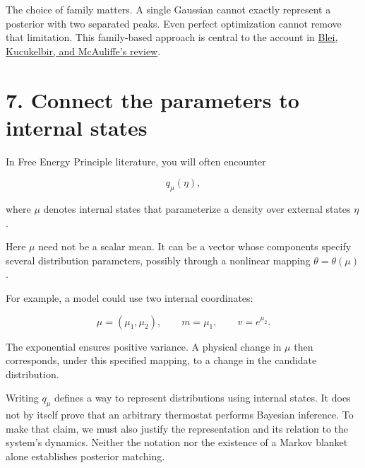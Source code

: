 \documentclass[
  letterpaper,
  DIV=11,
  numbers=noendperiod]{scrreprt}
\begin{document}
The choice of family matters. A single Gaussian cannot exactly represent
a posterior with two separated peaks. Even perfect optimization cannot
remove that limitation. This family-based approach is central to the
account in \href{https://arxiv.org/abs/1601.00670}{Blei, Kucukelbir, and
McAuliffe's review}.

\section{7. Connect the parameters to internal
states}\label{connect-the-parameters-to-internal-states}

In Free Energy Principle literature, you will often encounter

\[
q_\mu(\eta),
\]

where \(\mu\) denotes internal states that parameterize a density over
external states \(\eta\).

Here \(\mu\) need not be a scalar mean. It can be a vector whose
components specify several distribution parameters, possibly through a
nonlinear mapping \(\theta=\theta(\mu)\).

For example, a model could use two internal coordinates:

\[
\mu=(\mu_1,\mu_2),
\qquad m=\mu_1,
\qquad v=e^{\mu_2}.
\]

The exponential ensures positive variance. A physical change in \(\mu\)
then corresponds, under this specified mapping, to a change in the
candidate distribution.

\begin{tcolorbox}[enhanced jigsaw, arc=.35mm, bottomrule=.15mm, bottomtitle=1mm, breakable, colback=white, colbacktitle=quarto-callout-note-color!10!white, colframe=quarto-callout-note-color-frame, coltitle=black, left=2mm, leftrule=.75mm, opacityback=0, opacitybacktitle=0.6, rightrule=.15mm, title=\textcolor{quarto-callout-note-color}{\faInfo}\hspace{0.5em}{A mathematical representation needs justification}, titlerule=0mm, toprule=.15mm, toptitle=1mm]

Writing \(q_\mu\) defines a way to represent distributions using
internal states. It does not by itself prove that an arbitrary
thermostat performs Bayesian inference. To make that claim, we must also
justify the representation and its relation to the system's dynamics.
Neither the notation nor the existence of a Markov blanket alone
establishes posterior matching.

\end{tcolorbox}
\end{document}
